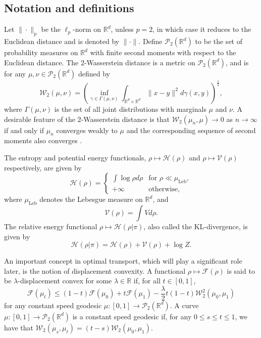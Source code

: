 \documentclass[final,12pt]{colt2018}
\newcommand{\was}{\mathcal{W}}
\begin{document}
\subsection{Notation and definitions}\label{sec:notation}
Let $\|\cdot\|_p$ be the $\ell_p$-norm on $\mathbb{R}^d$, unless $p = 2$, in which case it reduces to the Euclidean distance and is denoted by $\|\cdot\|$. Define $\mathcal{P}_2(\mathbb{R}^d)$ to be the set of probability measures on $\mathbb{R}^d$ with finite second moments with respect to the Euclidean distance. The $2$-Wasserstein distance is a metric on $\mathcal{P}_2(\mathbb{R}^d)$, and is for any $\mu,\nu \in \mathcal{P}_2(\mathbb{R}^d)$ defined by
\begin{equation}
\was_2(\mu,\nu) = \left(\inf_{\gamma \in \Gamma(\mu,\nu)} \int_{\mathbb{R}^d\times \mathbb{R}^d} \|x-y\|^2 d\gamma(x,y)\right)^{\frac{1}{2}},
\end{equation}
where $\Gamma(\mu,\nu)$ is the set of all joint distributions with marginals $\mu$ and $\nu$. A desirable feature of the $2$-Wasserstein distance is that 
$\was_2(\mu_n, \mu) \to 0$ as $n \to \infty$ if and only if $\mu_n$ converges weakly to $\mu$ and the corresponding sequence of second moments also converges \citep[Theorem 6.9]{villani2008}.

The entropy and potential energy functionals, $\rho \mapsto \mathcal{H}(\rho)$ and $\rho \mapsto \mathcal{V}(\rho)$  respectively, are given by 
\begin{equation}\label{eq:entropy}
\mathcal{H}(\rho) =
\begin{cases}
\int \log \rho d\rho & \text{for $\rho \ll \mu_{\text{Leb}}$},  \\
+\infty & \text{otherwise},
\end{cases}
\end{equation}
where $\mu_{\text{Leb}}$ denotes the Lebesgue measure on $\mathbb{R}^d$, and
\begin{equation}\label{eq:potential_energy}
\mathcal{V}(\rho) = \int V d\rho.
\end{equation}
The relative energy functional $\rho \mapsto \mathcal{H}(\rho | \pi)$, also called the KL-divergence, is given by
\begin{equation}\label{eq:relative_entropy}
\mathcal{H}(\rho | \pi)  =  \mathcal{H}(\rho) + \mathcal{V}(\rho) + \log Z.
\end{equation}

An important concept in optimal transport, which will play a significant role later, is the notion of displacement convexity. A functional $\rho \mapsto \mathcal{F}(\rho)$ is
said to be $\lambda$-displacement convex for some $\lambda \in\mathbb{R}$ if, for all $t\in [0,1]$,
\begin{equation}
\mathcal{F}(\mu_t) \leq (1-t)\mathcal{F}(\mu_0) + t\mathcal{F}(\mu_1) - \frac{\lambda}{2}t(1-t)\was_2^2(\mu_0,\mu_1)
\end{equation}
for any constant speed geodesic $\mu:[0,1]\to \mathcal{P}_2(\mathbb{R}^d)$. A curve $\mu:[0,1]\to \mathcal{P}_2(\mathbb{R}^d)$ is a  constant speed geodesic if, for any $0\leq s\leq t\leq 1$, we have that $\was_2(\mu_s,\mu_t) = (t-s)\was_2(\mu_0,\mu_1).$
\end{document}
